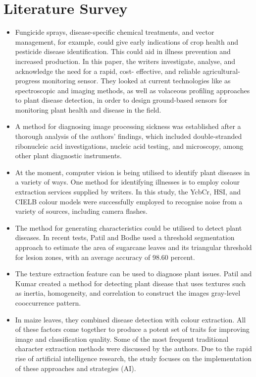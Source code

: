 \chapter{Literature Survey}
\label{ch:LR}

\begin{itemize}
\item Fungicide sprays, disease-specific chemical treatments, and vector management, for
example, could give early indications of crop health and pesticide disease
identification. This could aid in illness prevention and increased production. In this
paper, the writers investigate, analyse, and acknowledge the need for a rapid, cost-
effective, and reliable agricultural-progress monitoring sensor. They looked at current
technologies like as spectroscopic and imaging methods, as well as volaceous
profiling approaches to plant disease detection, in order to design ground-based
sensors for monitoring plant health and disease in the field. 

\item A method for diagnosing image processing sickness was established after a thorough
analysis of the authors' findings, which included double-stranded ribonucleic acid
investigations, nucleic acid testing, and microscopy, among other plant diagnostic
instruments.

\item At the moment, computer vision is being utilised to identify plant diseases in a
variety of ways. One method for identifying illnesses is to employ colour extraction
services supplied by writers. In this study, the YcbCr, HSI, and CIELB colour models
were successfully employed to recognise noise from a variety of sources, including
camera flashes.

\item The method for generating characteristics could be utilised to detect plant diseases.
In recent tests, Patil and Bodhe used a threshold segmentation approach to estimate
the area of sugarcane leaves and its triangular threshold for lesion zones, with an
average accuracy of 98.60 percent.

\item The texture extraction feature can be used to diagnose plant issues. Patil and
Kumar created a method for detecting plant disease that uses textures such as inertia,
homogeneity, and correlation to construct the images gray-level cooccurrence pattern.

\item In maize leaves, they combined disease detection with colour extraction. All of these
factors come together to produce a potent set of traits for improving image and
classification quality. Some of the most frequent traditional character extraction
methods were discussed by the authors. Due to the rapid rise of artificial intelligence
research, the study focuses on the implementation of these approaches and strategies
(AI).


\end{itemize}
